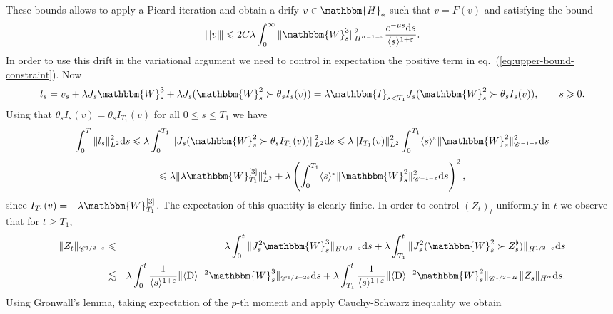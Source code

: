 \documentclass[11pt, oneside]{article}   	%
\newcommand{\mathD}{\mathrm{D}}
\newcommand{\mathd}{\mathrm{d}}
\newcommand{\VV}{\mathscr{C}}
\begin{document}
These bounds allows to apply a Picard iteration and obtain a drify $v \in
\mathbbm{H}_a$ such that $v = F (v)$ and satisfying the bound
\[ \interleave v \interleave \leqslant 2 C \lambda \int_0^{\infty} \|
   \mathbbm{W}_s^3 \|_{H^{\alpha - 1 - \varepsilon}}^2 \frac{e^{- \mu s}
   \mathd s}{\langle s \rangle^{1 + \varepsilon}} . \]
In order to use this drift in the variational argument we need to control in
expectation the positive term in eq.~(\ref{eq:upper-bound-constraint}). Now
\[ l_s = v_s + \lambda J_s \mathbbm{W}_s^3 + \lambda J_s (\mathbbm{W}^2_s
   \succ \theta_s I_s (v)) = \lambda \mathbbm{I}_{s < T_1} J_s
   (\mathbbm{W}^2_s \succ \theta_s I_s (v)), \qquad s \geqslant 0. \]
Using that $\theta_s I_s (v) = \theta_s I_{T_1} (v)$ for all $0 \leqslant s
\leqslant T_1$ we have
\[ \int_0^T \| l_s \|^2_{L^2} \mathd s \leqslant \lambda \int_0^{T_1} \| J_s
   (\mathbbm{W}^2_s \succ \theta_s I_{T_1} (v)) \|^2_{L^2} \mathd s
   \leqslant \lambda \| I_{T_1} (v) \|_{L^2}^2 \int_0^{T_1} \langle s
   \rangle^{\varepsilon} \| \mathbbm{W}^2_s \|^2_{\VV^{- 1 - \varepsilon}}
   \mathd s \]
\[ \leqslant \lambda \| \lambda \mathbbm{W}_{T_1}^{[3]} \|_{L^2}^4 + \lambda
   \left( \int_0^{T_1} \langle s \rangle^{\varepsilon} \| \mathbbm{W}^2_s
   \|^2_{\VV^{- 1 - \varepsilon}} \mathd s \right)^2, \]
since $I_{T_1} (v) = - \lambda \mathbbm{W}_{T_1}^{[3]}$. The expectation of
this quantity is clearly finite. In order to control $(Z_t)_t$ uniformly in
$t$ we observe that for $t \geqslant T_1$,
\begin{eqnarray*}
  \| Z_t \|_{\VV^{1 / 2 - \varepsilon}} & \leqslant & \lambda \int_0^t \|
  J_s^2 \mathbbm{W}_s^3 \|_{H^{1 / 2 - \varepsilon}} \mathd s + \lambda
  \int^t_{T_1} \| J^2_s (\mathbbm{W}^2_s \succ Z^{\flat}_s ) \|_{H^{1 / 2 -
  \varepsilon}} \mathd s\\
  & \lesssim & \lambda \int_0^t \frac{1}{\langle s \rangle^{1 + \varepsilon}}
  \| \langle \mathD \rangle^{- 2} \mathbbm{W}_s^3 \|_{\VV^{1 / 2 - 2
  \varepsilon}} \mathd s + \lambda \int^t_{T_1} \frac{1}{\langle s \rangle^{1
  + \varepsilon}} \| \langle \mathD \rangle^{- 2} \mathbbm{W}^2_s \|_{\VV^{1 /
  2 - 2 \varepsilon}}  \| Z_s \|_{H^{\alpha}} \mathd s.
\end{eqnarray*}
Using Gronwall's lemma, taking expectation of the $p$-th moment and apply
Cauchy-Schwarz inequality we obtain
\end{document}
